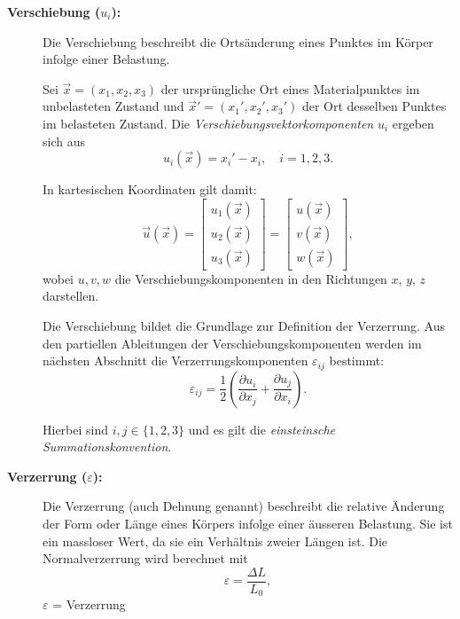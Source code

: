\begin{description}
\item[\textbf{Verschiebung ($u_i$):}]
Die Verschiebung beschreibt die Ortsänderung eines Punktes im Körper
infolge einer Belastung.

Sei $\vec{x} = (x_1, x_2, x_3)$ der ursprüngliche Ort eines
Materialpunktes im unbelasteten Zustand und $\vec{x}' = (x_1', x_2',
x_3')$ der Ort desselben Punktes im belasteten Zustand.
Die \emph{Verschiebungsvektorkomponenten} $u_i$ ergeben sich aus
%
\begin{equation*}
	u_i(\vec{x}) = x_i' - x_i,
	\quad i = 1,2,3.
\end{equation*}

In kartesischen Koordinaten gilt damit:
\[
\vec{u}(\vec{x}) =
\begin{bmatrix}
	u_1(\vec{x}) \\
	u_2(\vec{x}) \\
	u_3(\vec{x})
\end{bmatrix}
=
\begin{bmatrix}
	u(\vec{x}) \\
	v(\vec{x}) \\
	w(\vec{x})
\end{bmatrix},
\]
wobei $u, v, w$ die Verschiebungskomponenten in den Richtungen $x$, $y$, $z$
darstellen.

Die Verschiebung bildet die Grundlage zur Definition der Verzerrung. 
Aus den partiellen Ableitungen der Verschiebungskomponenten werden
im nächsten Abschnitt die Verzerrungskomponenten $\varepsilon_{ij}$
bestimmt:
\begin{equation*}
	\varepsilon_{ij} = \frac{1}{2}
	\left(
	\frac{\partial u_i}{\partial x_j}
	+
	\frac{\partial u_j}{\partial x_i}
	\right).
\end{equation*}

Hierbei sind $i,j \in \{1,2,3\}$ und es gilt die
\emph{einsteinsche Summationskonvention}.
%

\item[\textbf{Verzerrung ($\varepsilon$):}]
Die Verzerrung (auch Dehnung genannt) beschreibt die relative
%
%
Änderung der Form oder Länge eines Körpers infolge einer äusseren
Belastung.
Sie ist ein massloser Wert, da sie ein Verhältnis zweier Längen ist.
Die Normalverzerrung wird berechnet mit
	\begin{equation*}
		\varepsilon 
		= \frac{\Delta L}{L_0},
	\end{equation*}
	$\varepsilon$ = Verzerrung
	

\end{description}
